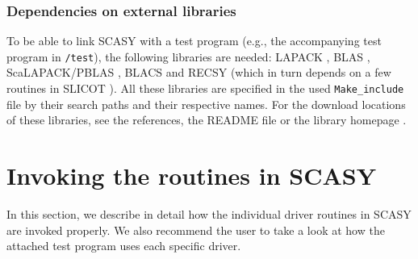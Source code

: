 \documentclass[11pt]{article}
\begin{document}
\subsubsection{Dependencies on external libraries} To be able to link SCASY with
a test program (e.g., the accompanying test program in
\texttt{/test}), the following libraries are needed: LAPACK
\cite{lapack}, BLAS \cite{BLAS3a}, ScaLAPACK/PBLAS \cite{slug},
BLACS \cite{blacs} and RECSY \cite{RECSY} (which in turn depends
on a few routines in SLICOT \cite{slicot}). All these libraries are
specified in the used \texttt{Make\_include} file by their search
paths and their respective names. For the download locations of
these libraries, see the references, the README file or the
library homepage \cite{scasy}.

\section{Invoking the routines in SCASY}
In this section, we describe in detail how the individual driver
routines in SCASY are invoked properly. We also recommend the user
to take a look at how the attached test program uses each specific
driver.
\end{document}
